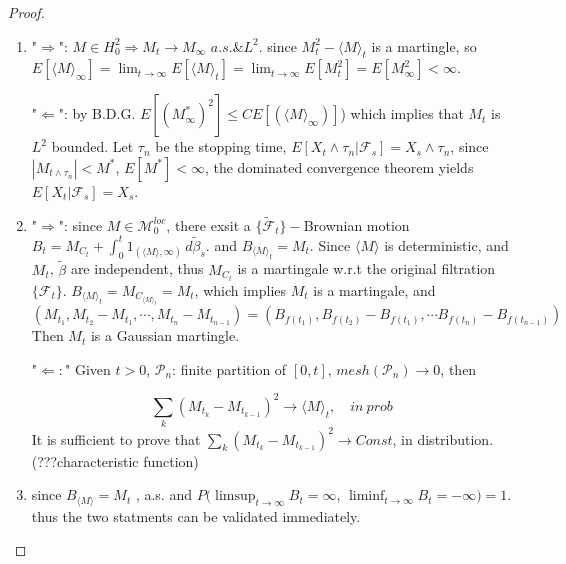 \documentclass{article}     %
\begin{document}
\begin{proof}
\begin{enumerate}[(1)]
    \item "$\Rightarrow$": $M \in H_0^2 \Rightarrow M_t \rightarrow M_{\infty}$ $ a.s. {\&} L^2$. since $M_t^2 - \langle M \rangle_t $ is a martingle, so $E[\langle M \rangle_{\infty} ] = \lim_{ t \rightarrow \infty} E[\langle M \rangle_t]=\lim_{t \rightarrow \infty} E[M^2_t]= E[M^2_{\infty}]<\infty $.
    
        "$\Leftarrow$": by B.D.G. $E[(M_{\infty}^*)^2]\leq CE[(\langle M \rangle_{\infty})]$) which implies that $M_t$ is $L^2$ bounded.  Let $\tau_n$ be the stopping time, $E[X_t\wedge\tau_n|\mathcal{F}_s]=X_s\wedge\tau_n$, since $ |M_{t\wedge {\tau_n}}| < M^*$, $E[M^*]<\infty$, the dominated convergence theorem yields $E[X_t|\mathcal{F}_s]=X_s$.
        
        \item "$\Rightarrow$": since $M \in \mathcal{M}_0^{loc}$, there exsit a $\{\widetilde{\mathcal{F}}_t\}-$Brownian motion  $B_t = M_{C_t}+ \int_0^{t} 1_{(\langle M\rangle, \infty)}\,d\widetilde{\beta}_s$. and $B_{\langle M \rangle_t} = M_t$. Since $\langle M \rangle$ is deterministic, and $M_t$, $\widetilde{\beta}$ are independent, thus $M_{C_t}$ is a martingale w.r.t the original filtration $\{\mathcal{F}_t\}$. $B_{\langle M \rangle_t} = M_{C_{\langle M \rangle_t}}= M_t$, which implies $M_t$ is a martingale, and  
        \[(M_{t_1},M_{t_2}-M_{t_1},\cdots, M_{t_n}-M_{t_{n-1}}) = (B_{f(t_1)}, B_{f(t_2)}-B_{f(t_1)}, \cdots B_{f(t_n)}-B_{f(t_{n-1})})\]
        Then $M_t$ is a Gaussian martingle.
        
        "$\Leftarrow:$" Given $t>0$, $\mathcal{P}_n$: finite partition of $[0,t]$, $mesh (\mathcal{P}_n)\rightarrow 0$, then
         
       \[\sum_k (M_{t_k}-M_{t_{k-1}})^2\rightarrow \langle M \rangle_t,\quad in~prob\]
       It is sufficient to prove that $\sum_k (M_{t_k}-M_{t_{k-1}})^2\rightarrow Const$, in distribution. (???characteristic function)
       
        \item since $B_{\langle M \rangle } = M_t$ , a.s. and $P(\limsup_{t \rightarrow \infty} B_t = \infty$, $\liminf_{t \rightarrow \infty} B_t =- \infty)= 1$. thus the two statments can be validated immediately.
\end{enumerate}
\end{proof}
\end{document}
